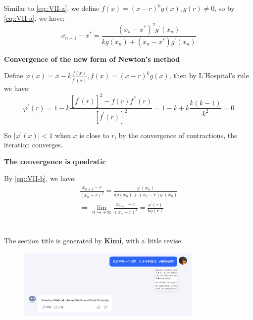 \documentclass[a4paper]{article}
\begin{document}
Similar to \ref{eq::VII-a}, we define $f(x) = (x-r)^k g(x), g(r) \ne 0$, so by \ref{eq::VII-a}, we have:
\begin{equation}
  x_{n+1} - x^* = \frac{(x_n - x^*)^2 g^\prime(x_n)}{k g(x_n) + (x_n-x^*) g^\prime(x_n)}
  \label{eq::VII-b}
\end{equation}

\textbf{Convergence of the new form of Newton's method}

Define $\varphi(x) = x - k \frac{f(x)}{f^\prime(x)}, f(x) = (x-r)^k g(x)$, then by L'Hospital's rule we have:
\begin{equation}
  \varphi^\prime (r) = 1 - k \frac{[f^\prime (r)]^2 - f(r)f^{\prime \prime}(r)}{[f^\prime (r)]^2} = 1-k + k \frac{k(k-1)}{k^2} = 0
\end{equation}

So $\vert \varphi^\prime (x) \vert < 1$ when $x$ is close to $r$, by the convergence of contractions, the iteration converges. 

\textbf{The convergence is quadratic}

By \ref{eq::VII-b}, we have:
\begin{equation}
  \begin{aligned}
    \frac{x_{n+1} - r}{(x_n - r)^2} = \frac{ g^\prime(x_n)}{k g(x_n) + (x_n-r) g^\prime(x_n)}\\
    \Rightarrow \lim_{n \rightarrow +\infty} \frac{x_{n+1} - r}{(x_n - r)^2} = \frac{g^\prime(r)}{k g(r)}
  \end{aligned}
\end{equation}

\section*{  }
The section title is generated by \textbf{Kimi}, with a little revise. 
\begin{figure}[H]
  \begin{center}
    \includegraphics[width=0.8\textwidth]{./figure/kimi.png}
  \end{center}
\end{figure}

\printbibliography
\end{document}
